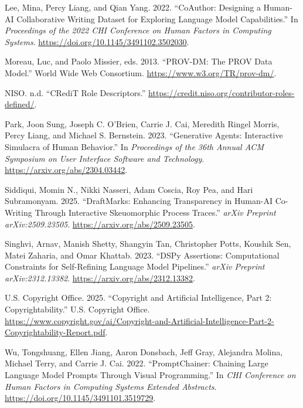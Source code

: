 \documentclass[
]{article}
\newlength{\cslhangindent}
\newenvironment{CSLReferences}[2] %
 {\begin{list}{}{%
  \setlength{\itemindent}{0pt}
  \setlength{\leftmargin}{0pt}
  \setlength{\parsep}{0pt}
  \ifodd #1
   \setlength{\leftmargin}{\cslhangindent}
   \setlength{\itemindent}{-1\cslhangindent}
  \fi
  \setlength{\itemsep}{#2\baselineskip}}}
 {\end{list}}
\begin{document}
\begin{CSLReferences}{1}{0}
Lee, Mina, Percy Liang, and Qian Yang. 2022. {``CoAuthor: Designing a
Human-AI Collaborative Writing Dataset for Exploring Language Model
Capabilities.''} In \emph{Proceedings of the 2022 CHI Conference on
Human Factors in Computing Systems}.
\url{https://doi.org/10.1145/3491102.3502030}.

Moreau, Luc, and Paolo Missier, eds. 2013. {``PROV-DM: The PROV Data
Model.''} World Wide Web Consortium.
\url{https://www.w3.org/TR/prov-dm/}.

NISO. n.d. {``CRediT Role Descriptors.''}
\url{https://credit.niso.org/contributor-roles-defined/}.

Park, Joon Sung, Joseph C. O'Brien, Carrie J. Cai, Meredith Ringel
Morris, Percy Liang, and Michael S. Bernstein. 2023. {``Generative
Agents: Interactive Simulacra of Human Behavior.''} In \emph{Proceedings
of the 36th Annual ACM Symposium on User Interface Software and
Technology}. \url{https://arxiv.org/abs/2304.03442}.

Siddiqui, Momin N., Nikki Nasseri, Adam Coscia, Roy Pea, and Hari
Subramonyam. 2025. {``DraftMarks: Enhancing Transparency in Human-AI
Co-Writing Through Interactive Skeuomorphic Process Traces.''}
\emph{arXiv Preprint arXiv:2509.23505}.
\url{https://arxiv.org/abs/2509.23505}.

Singhvi, Arnav, Manish Shetty, Shangyin Tan, Christopher Potts, Koushik
Sen, Matei Zaharia, and Omar Khattab. 2023. {``DSPy Assertions:
Computational Constraints for Self-Refining Language Model Pipelines.''}
\emph{arXiv Preprint arXiv:2312.13382}.
\url{https://arxiv.org/abs/2312.13382}.

U.S. Copyright Office. 2025. {``Copyright and Artificial Intelligence,
Part 2: Copyrightability.''} U.S. Copyright Office.
\url{https://www.copyright.gov/ai/Copyright-and-Artificial-Intelligence-Part-2-Copyrightability-Report.pdf}.

Wu, Tongshuang, Ellen Jiang, Aaron Donsbach, Jeff Gray, Alejandra
Molina, Michael Terry, and Carrie J. Cai. 2022. {``PromptChainer:
Chaining Large Language Model Prompts Through Visual Programming.''} In
\emph{CHI Conference on Human Factors in Computing Systems Extended
Abstracts}. \url{https://doi.org/10.1145/3491101.3519729}.


\end{CSLReferences}
\end{document}
